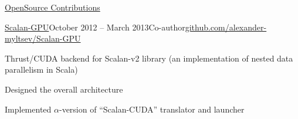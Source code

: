 \documentclass{resume} %
\begin{document}
\begin{rSection}{\href{https://github.com/alexander-myltsev?tab=repositories}{OpenSource Contributions}}
\begin{comment}
\begin{samepage}
\begin{rSubsection}{\href{http://github.com/alexander-myltsev/sbt-uglify}{sbt-uglify}}{}{Author}{\href{http://github.com/alexander-myltsev/sbt-uglify}{github.com/alexander-myltsev/sbt-uglify}}
\item Scala SBT plugin that compresses JavaScript/mustache files with UglifyJS
\end{rSubsection}
\end{samepage}
\end{comment}

\begin{samepage}
\begin{rSubsection}{\href{http://github.com/alexander-myltsev/Scalan-GPU}{Scalan-GPU}}{October 2012 -- March 2013}{Co-author}{\href{http://github.com/alexander-myltsev/Scalan-GPU}{github.com/alexander-myltsev/Scalan-GPU}}
\item Thrust/CUDA backend for Scalan-v2 library (an implementation of nested data parallelism in Scala)
\item Designed the overall architecture
\item Implemented $\alpha$-version of ``Scalan-CUDA'' translator and launcher
\end{rSubsection}
\end{samepage}

\begin{comment}
\begin{samepage}
\begin{rSubsectionEmpty}{\href{http://github.com/aspnet/Mvc}{ASP.NET MVC4}}{September 2012 -- November 2012}{Contributor}{\href{http://github.com/aspnet/Mvc}{github.com/aspnet/Mvc}}
\end{rSubsectionEmpty}
\end{samepage}
\end{comment}

\end{rSection}


\pagebreak
\end{document}
